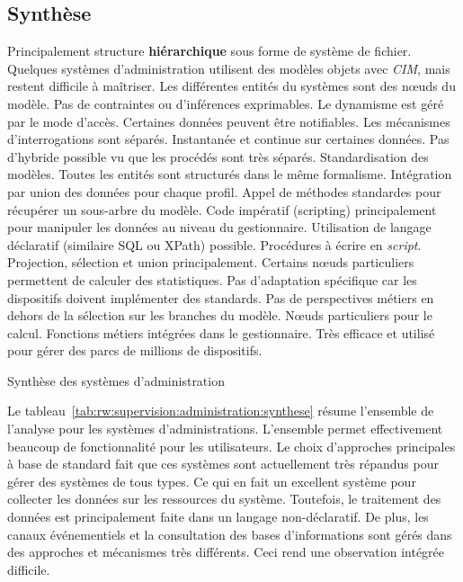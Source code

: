 \subsection{Synthèse}

\begin{table}[!ht]
\criteretabDonnee
    {Principalement structure \textbf{hiérarchique} sous forme de système de fichier. Quelques systèmes d'administration utilisent des modèles objets avec \textit{CIM}, mais restent difficile à maîtriser.}
    {Les différentes entités du systèmes sont des nœuds du modèle. Pas de contraintes ou d'inférences exprimables.}
    {Le dynamisme est géré par le mode d'accès. Certaines données peuvent être notifiables. Les mécanismes d'interrogations sont séparés.}
\criteretabTraitement
    {Instantanée et continue sur certaines données. Pas d'hybride possible vu que les procédés sont très séparés.}
    {Standardisation des modèles. Toutes les entités sont structurés dans le même formalisme. Intégration par union des données pour chaque profil.}
    {Appel de méthodes standardes pour récupérer un sous-arbre du modèle. Code impératif (scripting) principalement pour manipuler les données au niveau du gestionnaire. Utilisation de langage déclaratif (similaire SQL ou XPath) possible.}
    {Procédures à écrire en \textit{script}. Projection, sélection et union principalement. Certains nœuds particuliers permettent de calculer des statistiques.}
\criteretabAdaptabilite
    {Pas d'adaptation spécifique car les dispositifs doivent implémenter des standards.}
    {Pas de perspectives métiers en dehors de la sélection sur les branches du modèle.}
    {Nœuds particuliers pour le calcul. Fonctions métiers intégrées dans le gestionnaire.}
    {Très efficace et utilisé pour gérer des parcs de millions de dispositifs.}
\caption{Synthèse des systèmes d'administration}\label{tab:rw:supervision:administration:synthese}
\end{table}

Le tableau~\ref{tab:rw:supervision:administration:synthese} résume l'ensemble de l'analyse pour les systèmes d'administrations. L'ensemble permet effectivement beaucoup de fonctionnalité pour les utilisateurs. Le choix d'approches principales à base de standard fait que ces systèmes sont actuellement très répandus pour gérer des systèmes de tous types. Ce qui en fait un excellent système pour collecter les données sur les ressources du système. Toutefois, le traitement des données est principalement faite dans un langage non-déclaratif. De plus, les canaux événementiels et la consultation des bases d'informations sont gérés dans des approches et mécanismes très différents. Ceci rend une observation intégrée difficile.